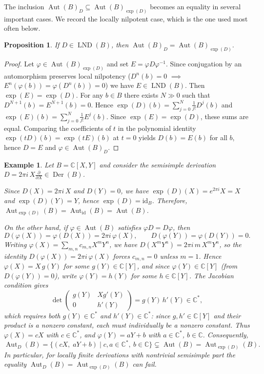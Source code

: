 \documentclass[11pt,a4paper,reqno]{amsart}
\newtheorem{proposition}[theorem]{Proposition}
\newtheorem{example}[theorem]{Example}
\newcommand{\LND}[0]{\ensuremath{\operatorname{LND}}}
\newcommand{\Aut}[0]{\ensuremath{\operatorname{Aut}}}
\begin{document}
The inclusion $\Aut(B)_D\subseteq \Aut(B)_{\exp(D)}$ becomes an equality in several important cases.
We record the locally nilpotent case, which is the one used most often below.
 
\begin{proposition}\label{prop:LND-equality}
If $D\in\LND(B)$, then $\Aut(B)_D=\Aut(B)_{\exp(D)}$.
\end{proposition}
 
\begin{proof}
Let $\varphi\in\Aut(B)_{\exp(D)}$ and set $E=\varphi D\varphi^{-1}$. Since conjugation by an automorphism preserves local nilpotency ($D^n(b)=0$ $\implies$ $E^n(\varphi(b))=\varphi(D^n(b))=0$) we have $E\in\LND(B)$.
Then $\exp(E)=\exp(D)$. For any $b\in B$ there exists $N\gg 0$ such that
$D^{N+1}(b)=E^{N+1}(b)=0$. Hence $\exp(D)(b)=\sum_{j=0}^N\frac1{j!}D^j(b)$ and $\exp(E)(b)=\sum_{j=0}^N\frac1{j!}E^j(b)$.
Since $\exp(E)=\exp(D)$, these sums are equal. Comparing the coefficients of $t$ in the polynomial identity
$\exp(tD)(b)=\exp(tE)(b)$ at $t=0$ yields $D(b)=E(b)$ for all $b$, hence $D=E$ and
$\varphi\in\Aut(B)_D$.
\end{proof}
 
 
\begin{example}\label{ex:semisimple-diff}
Let $B=\mathbb{C}[X,Y]$ and consider the semisimple derivation $D=2\pi i\,X\frac{\partial}{\partial X}\in \operatorname{Der}(B)$.
 
Since $D(X)=2\pi i\,X$ and $D(Y)=0$, we have $\exp(D)(X)=e^{2\pi i}X=X$ and $\exp(D)(Y)=Y$,
hence $\exp(D)=\mathrm{id}_B$. Therefore, $\Aut_{\exp(D)}(B)=\Aut_{\mathrm{id}}(B)=\Aut(B)$.
 
On the other hand, if $\varphi\in\Aut(B)$ satisfies $\varphi D=D\varphi$, then
\[
D(\varphi(X))=\varphi(D(X))=2\pi i\,\varphi(X), \qquad
D(\varphi(Y))=\varphi(D(Y))=0.
\]
Writing $\varphi(X)=\sum_{m,n} c_{m,n}X^mY^n$, we have
$D(X^mY^n)=2\pi i\,m\,X^mY^n$, so the identity \linebreak 
$D(\varphi(X))=2\pi i\,\varphi(X)$ forces $c_{m,n}=0$ unless $m=1$.
Hence $\varphi(X)=X\,g(Y)$ for some $g(Y)\in\mathbb{C}[Y]$, and since $\varphi(Y)\in\mathbb{C}[Y]$ (from $D(\varphi(Y))=0$), write $\varphi(Y)=h(Y)$ for some $h\in\mathbb{C}[Y]$. The Jacobian condition gives
\[
\det\begin{pmatrix} g(Y) & Xg'(Y) \\ 0 & h'(Y) \end{pmatrix} = g(Y)\,h'(Y) \in \mathbb{C}^*,
\]
which requires both $g(Y)\in\mathbb{C}^*$ and $h'(Y)\in\mathbb{C}^*$: since $g,h'\in\mathbb{C}[Y]$ and their product is a nonzero constant, each must individually be a nonzero constant. Thus $\varphi(X)=cX$ with $c\in\mathbb{C}^*$, and \linebreak $\varphi(Y)=aY+b$ with $a\in\mathbb{C}^*$, $b\in\mathbb{C}$.
Consequently,
\[
\operatorname{Aut}_D(B)=\{(cX,\; aY+b)\mid c,a\in\mathbb{C}^{\ast},\ b\in\mathbb{C}\} \subsetneq \Aut(B)=\Aut_{\exp(D)}(B).
\]
In particular, for locally finite derivations with nontrivial semisimple part the equality \linebreak
$\Aut_D(B)=\Aut_{\exp(D)}(B)$ can fail.
\end{example}
 
\end{document}
